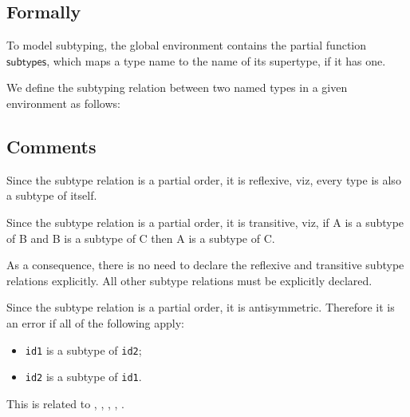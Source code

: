 \documentclass{book}
\newcommand\subtypes[0]{\textsf{subtypes}}
\newcommand\tenv[0]{\texttt{env}}
\newcommand\vtone[0]{\texttt{t1}}
\newcommand\vttwo[0]{\texttt{t2}}
\newcommand\tty[0]{\texttt{ty}}
\begin{document}
\begin{emptyformal}
    \subsection{Formally}
\end{emptyformal}

To model subtyping, the global environment contains the partial function \\
$\subtypes$, which maps a type name to the name of its supertype, if it has
one.

We define the subtyping relation between two named types in a given environment as follows:

  \subsection{Comments}
  Since the subtype relation is a partial order, it is reflexive, viz,
  every type is also a subtype of itself.

  Since the subtype relation is a partial order, it is transitive, viz, if A is
  a subtype of B and B is a subtype of C then A is a subtype of C.

  As a consequence, there is no need to declare the reflexive and transitive
  subtype relations explicitly. All other subtype relations must be explicitly
  declared.

  Since the subtype relation is a partial order, it is antisymmetric. Therefore
  it is an error if all of the following apply:
  \begin{itemize}
  \item \texttt{id1} is a subtype of \texttt{id2};
  \item \texttt{id2} is a subtype of \texttt{id1}.
  \end{itemize}

  This is related to , , , , .
\end{document}
